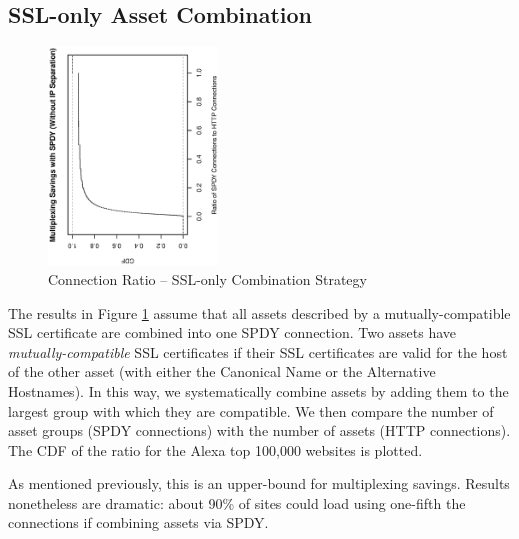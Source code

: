 \documentclass[10pt,letterpaper,notitlepage]{article}
\begin{document}
\subsection{SSL-only Asset Combination}
\begin{figure}[h!]
\centering
\includegraphics[width=0.4\textwidth,angle=270]{plots/asset_combination_only_ssl_ratio.eps}
\caption{Connection Ratio -- SSL-only Combination Strategy}
\label{fig:combination-ssl}
\end{figure}
The results in Figure \ref{fig:combination-ssl} assume that all assets
described by a mutually-compatible SSL certificate are combined into one SPDY
connection. Two assets have \textit{mutually-compatible} SSL certificates if
their SSL certificates are valid for the host of the other asset (with either
the Canonical Name or the Alternative Hostnames). In this way, we
systematically combine assets by adding them to the largest group with which
they are compatible. We then compare the number of asset groups (SPDY
connections) with the number of assets (HTTP connections). The CDF of the ratio
for the Alexa top 100,000 websites is plotted.

As mentioned previously, this is an upper-bound for multiplexing savings.
Results nonetheless are dramatic: about 90\% of sites could load using
one-fifth the connections if combining assets via SPDY.
\end{document}
